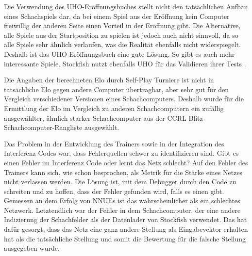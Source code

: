 

Die Verwendung des \ac{UHO}-Eröffnungsbuches stellt nicht den tatsächlichen Aufbau eines Schachspiels dar, da bei einem Spiel aus der Eröffnung kein Computer freiwillig der anderen Seite einen Vorteil in der Eröffnung gibt. Die Alternative, alle Spiele aus der Startposition zu spielen ist jedoch auch nicht sinnvoll, da so alle Spiele sehr ähnlich verlaufen, was die Realität ebenfalls nicht widerspiegelt. Deshalb ist das \ac{UHO}-Eröffnungsbuch eine gute Lösung. So gibt es auch mehr interessante Spiele. Stockfish nutzt ebenfalls \ac{UHO} für das Validieren ihrer Tests \cite{Fishtest}. 

Die Angaben der berechneten Elo durch Self-Play Turniere ist nicht in tatsächliche Elo gegen andere Computer übertragbar, aber sehr gut für den Vergleich verschiedener Versionen eines Schachcomputers. Deshalb wurde für die Ermittlung der Elo im Vergleich zu anderen Schachcomputern ein zufällig ausgewählter, ähnlich starker Schachcomputer aus der \ac{CCRL} \cite{CCRL} Blitz-Schachcomputer-Rangliste ausgewählt.

Das Problem in der Entwicklung des Trainers sowie in der Integration des Interferenz Codes war, dass Fehlerquellen schwer zu identifizieren sind. Gibt es einen Fehler im Interferenz Code oder lernt das Netz schlecht? Auf den Fehler des Trainers kann sich, wie schon besprochen, als Metrik für die Stärke eines Netzes nicht verlassen werden. Die Lösung ist, mit dem Debugger durch den Code zu schreiten und zu hoffen, dass der Fehler gefunden wird, falls es einen gibt. Gemessen an dem Erfolg von \acp{NNUE} ist das wahrscheinlicher als ein schlechtes Netzwerk. Letztendlich war der Fehler in dem Schachcomputer, der eine andere Indizierung der Schachfelder als der Datenlader von Stockfish verwendet. Das hat dafür gesorgt, dass das Netz eine ganz andere Stellung als Eingabevektor erhalten hat als die tatsächliche Stellung und somit die Bewertung für die falsche Stellung ausgegeben wurde.

